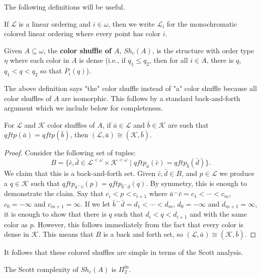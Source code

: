 \documentclass[11pt]{amsart}
\newcommand{\mc}[1]{\mathcal{#1}}
\newcommand{\Pinf}[1]{\Pi^{\mathrm{in}}_{#1}}
\theoremstyle{remark}
\newcommand{\define}[1]{\textbf{#1}}
\begin{document}
The following definitions will be useful.
\begin{definition}\label{def:onecoloredlos}
	If $\mc L$ is a linear ordering and $i\in\omega$, then we write $\mc L_i$ for the monochromatic colored linear ordering where every point has color $i$.
\end{definition}
\begin{definition}\label{def:colorshuffle}
	Given $A\subseteq \omega$, the \define{color shuffle of $A$}, $Sh_c(A)$, is the structure with order type $\eta$ where each color in $A$ is dense (i.e., if $q_1\leq q_2$, then for all $i\in A$, there is $q$, $q_1<q<q_2$ so that $P_i(q)$).\end{definition}
The above definition says "the" color shuffle instead of "a" color shuffle because all color shuffles of $A$ are isomorphic.
This follows by a standard back-and-forth argument which we include below for completeness.
\begin{lemma}\label{lem:shufiso}
    For $\mc L$ and $\mc K$ color shuffles of $A$, if $\bar{a}\in\mc{L}$ and $\bar{b}\in \mc{K}$ are such that $qftp(\bar{a})=qftp(\bar{b})$, then
     $(\mc{L},\bar{a})\cong(\mc{K},\bar{b}).$
\end{lemma}

\begin{proof}
    Consider the following set of tuples:
    \[ B=\{\bar{c},\bar{d}\in\mc{L}^{<\omega}\times\mc{K}^{<\omega} \mid qftp_{\bar{a}}(\bar{c})=qftp_{\bar{b}}(\bar{d})\}.\]
    We claim that this is a back-and-forth set.
    Given $\bar{c},\bar{d}\in B$, and $p\in\mc{L}$ we produce a $q\in\mc{K}$ such that $qftp_{\bar{a}^\frown\bar{c}}(p)=qftp_{\bar{b}^\frown\bar{d}}(q)$.
    By symmetry, this is enough to demonstrate the claim.
    Say that $c_i<p<c_{i+1}$ where $\bar{a}^\frown\bar{c}=c_1<\cdots<c_m$, $c_0=-\infty$ and $c_{m+1}=\infty$.
    If we let $\bar{b}^\frown\bar{d}=d_1<\cdots<d_m$, $d_0=-\infty$ and $d_{m+1}=\infty$, it is enough to show that there is $q$ such that $d_i<q<d_{i+1}$ and with the same color as $p$.
    However, this follows immediately from the fact that every color is dense in $\mc{K}$.
    This means that $B$ is a back and forth set, so $(\mc{L},\bar{a})\cong(\mc{K},\bar{b}).$
\end{proof}

It follows that these colored shuffles are simple in terms of the Scott analysis.

\begin{corollary}\label{cor:ShufflePi2}
	The Scott complexity of $Sh_c(A)$ is $\Pinf{2}$.
\end{corollary}
\end{document}
